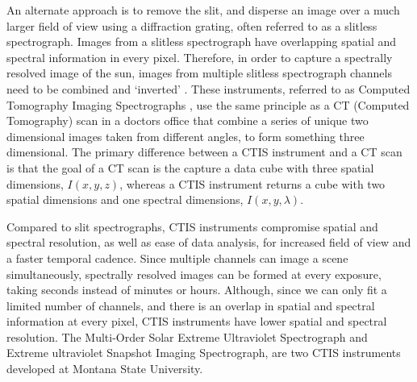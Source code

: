 An alternate approach is to remove the slit, and disperse an image over a much larger field of view using a diffraction grating, often referred to as a slitless spectrograph.
Images from a slitless spectrograph have overlapping spatial and spectral information in every pixel.
Therefore, in order to capture a spectrally resolved image of the sun, images from multiple slitless spectrograph channels need to be combined and `inverted' \citep[e.g.][]{KakSlaney2001}.
These instruments, referred to as Computed Tomography Imaging Spectrographs \citep[CTIS:][]{DescourDereniakCTIS1995}, use the same principle as a CT (Computed Tomography) scan in a doctors office that combine a series of unique two dimensional images taken from different angles, to form something three dimensional.
The primary difference between a CTIS instrument and a CT scan is that the goal of a CT scan is the capture a data cube with three spatial dimensions, $I(x,y,z)$, whereas a CTIS instrument returns a cube with two spatial dimensions and one spectral dimensions, $I(x,y,\lambda)$.

Compared to slit spectrographs, CTIS instruments compromise spatial and spectral resolution, as well as ease of data analysis, for increased field of view and a faster temporal cadence. 
Since multiple channels can image a scene simultaneously, spectrally resolved images can be formed at every exposure, taking seconds instead of minutes or hours.
Although, since we can only fit a limited number of channels, and there is an overlap in spatial and spectral information at every pixel, CTIS instruments have lower spatial and spectral resolution. 
The Multi-Order Solar Extreme Ultraviolet Spectrograph \citep[MOSES:{}][]{Fox2010} and Extreme ultraviolet Snapshot Imaging Spectrograph\citep[ESIS:][]{ESIS}, are two CTIS instruments developed at Montana State University.

